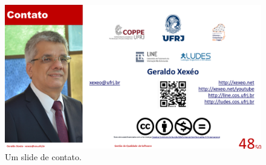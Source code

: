 \begin{figure}[hbt]
    \centering
    \includegraphics[width=\tam\linewidth,frame]{imagens/fim.png}
    \caption{Um slide de contato.}
    \label{fig:fim}
\end{figure}
